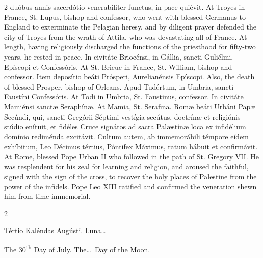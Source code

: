 \begin{paracol}{2}
 duóbus annis sacerdótio venerabíliter functus, in pace quiévit.
\switchcolumn
{}
At Troyes in France, St. Lupus, 
 bishop and confessor, who went with blessed Germanus to England to 
 exterminate the Pelagian heresy, and by diligent prayer defended the city of 
 Troyes from the wrath of Attila, who was devastating all of France. At 
 length, having religiously discharged the functions of the priesthood for 
 fifty-two years, he rested in peace.
\switchcolumn*
{}
In civitáte Briocénsi, 
 in Gállia, sancti Guliélmi, Epíscopi et Confessóris.
\switchcolumn
{}
At St. Brieuc in France, St. 
 William, bishop and confessor.
\switchcolumn*
{}
Item deposítio beáti 
 Prósperi, Aurelianénsis Epíscopi.
\switchcolumn
{}
Also, the death of blessed Prosper, 
 bishop of Orleans.
\switchcolumn*
{}
Apud Tudértum, in 
 Umbria, sancti Faustíni Confessóris.
\switchcolumn
{}
At Todi in Umbria, St. Faustinus, 
 confessor.
\switchcolumn*
{}
In civitáte Mamiénsi 
 sanctæ Seraphínæ.
\switchcolumn
{}
At Mamia, St. Serafina.
\switchcolumn*
{}
Romæ beáti Urbáni Papæ 
 Secúndi, qui, sancti Gregórii Séptimi vestígia secútus, doctrínæ et 
 religiónis stúdio enítuit, et fidéles Cruce signátos ad sacra Palæstínæ loca 
 ex infidélium domínio rediménda excitávit. Cultum autem, ab 
 immemorábili témpore eídem exhíbitum, Leo Décimus tértius, Póntifex Máximus, 
 ratum hábuit et confirmávit.
\switchcolumn
{}
At Rome, blessed Pope Urban II who 
 followed in the path of St. Gregory VII. He was resplendent for his 
 zeal for learning and religion, and aroused the faithful, signed with the 
 sign of the cross, to recover the holy places of Palestine from the power of 
 the infidels. Pope Leo XIII ratified and confirmed the veneration 
 shewn him from time immemorial.
\switchcolumn*
{}
\end{paracol}


\begin{paracol}{2}
\begin{center}{\color{gregoriocolor} Tértio Kaléndas Augústi. 
 Luna\dots\ }\end{center}
\switchcolumn
{}
\begin{center}{\color{gregoriocolor} The 
 30\textsuperscript{th} Day of 
 July. The\dots\ Day of the Moon.}\end{center}
\end{paracol}

